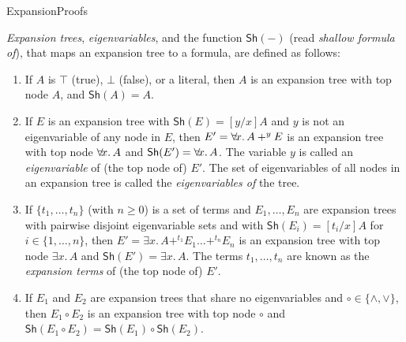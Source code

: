 


\maketitle

\begin{entry}{ExpansionProofs}  

\newcommand{\Deep}[1]{\mathsf{Dp}(#1)}
\newcommand{\Sh}[1]{\mathsf{Sh}(#1)}
\newcommand{\calE}{\mathcal{E}}

\newcommand\ALL   {}
\def\ALL#1.{\forall{#1}.\,}
\def\ALLx#1.{\forall\mkern -3mu{#1}.\,}
\newcommand\EX    {}
\def\EX#1.{\exists{#1}.\,}

\begin{calculus}

\emph{Expansion trees}, \emph{eigenvariables}, and the function
$\Sh{-}$ (read \emph{shallow formula of}), that maps an expansion
tree to a formula, are defined as follows:
\begin{enumerate} 
\item If $A$ is $\top$ (true), $\bot$ (false), or a literal, then $A$ is an
    expansion tree with top node $A$, and $\Sh{A} = A$.
\item If $E$ is an expansion tree with $\Sh{E}=[y/x]A$ and $y$ is not an
    eigenvariable of any node in $E$, then $E' = \ALLx x. A +^y E$ is
    an expansion tree with top node $\ALLx x. A$ and $\Sh{E'}
    = \ALLx x. A$.  The variable $y$ is called an {\em eigenvariable}
    of (the top node of) $E'$\kern -3pt.  The set of eigenvariables of
    all nodes in an expansion tree is called the \emph{eigenvariables
    of} the tree.
\item If $\{t_1,\ldots,t_n\}$ (with $n \ge 0$) is a set of terms and
    $E_1,\ldots,E_n$ are expansion trees with pairwise disjoint
    eigenvariable sets and with $\Sh{E_i} = [t_i/x]A$ for
    $i\in\{1,\ldots,n\}$, then $E' = \EX x.  A +^{t_1} E_1 \ldots
    +^{t_n} E_n$ is an expansion tree with top node $\EX x.  A$ and
    $\Sh{E'} = \EX x. A$.  The terms $t_1,\ldots,t_n$ are known
    as the \emph{expansion terms} of (the top node of) $E'$.
\item If $E_1$ and $E_2$ are expansion trees that share no eigenvariables and
    $\circ\in\{\land,\lor\}$, then $E_1\circ E_2$ is an expansion tree
    with top node $\circ$ and $\Sh{E_1\circ E_2}
    = \Sh{E_1} \circ \Sh{E_2}$.
\end{enumerate}


\end{calculus}
\end{entry}
